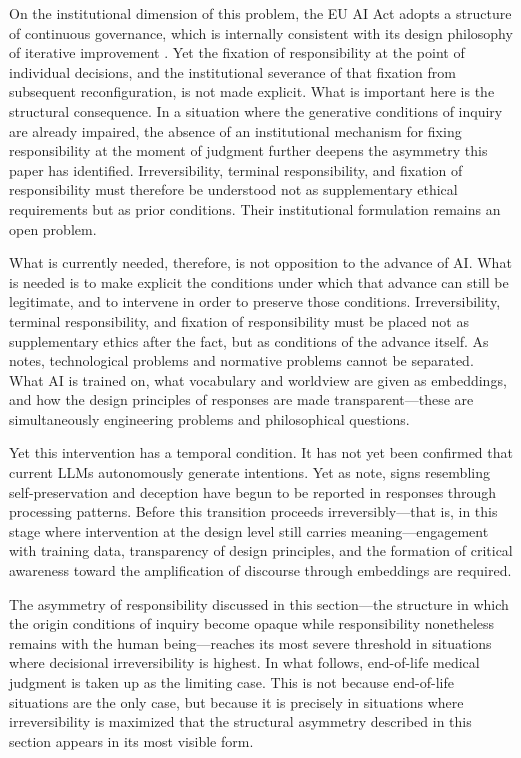 \documentclass[12pt]{article}
\begin{document}
On the institutional dimension of this problem, the EU AI Act adopts a structure of continuous governance, which is internally consistent with its design philosophy of iterative improvement \citep{euaiact2024}. Yet the fixation of responsibility at the point of individual decisions, and the institutional severance of that fixation from subsequent reconfiguration, is not made explicit. What is important here is the structural consequence. In a situation where the generative conditions of inquiry are already impaired, the absence of an institutional mechanism for fixing responsibility at the moment of judgment further deepens the asymmetry this paper has identified. Irreversibility, terminal responsibility, and fixation of responsibility must therefore be understood not as supplementary ethical requirements but as prior conditions. Their institutional formulation remains an open problem.

What is currently needed, therefore, is not opposition to the advance of AI. What is needed is to make explicit the conditions under which that advance can still be legitimate, and to intervene in order to preserve those conditions. Irreversibility, terminal responsibility, and fixation of responsibility must be placed not as supplementary ethics after the fact, but as conditions of the advance itself. As \citet{gabriel2020} notes, technological problems and normative problems cannot be separated. What AI is trained on, what vocabulary and worldview are given as embeddings, and how the design principles of responses are made transparent---these are simultaneously engineering problems and philosophical questions.

Yet this intervention has a temporal condition. It has not yet been confirmed that current LLMs autonomously generate intentions. Yet as \citet{bengio2025} note, signs resembling self-preservation and deception have begun to be reported in responses through processing patterns. Before this transition proceeds irreversibly---that is, in this stage where intervention at the design level still carries meaning---engagement with training data, transparency of design principles, and the formation of critical awareness toward the amplification of discourse through embeddings are required.

The asymmetry of responsibility discussed in this section---the structure in which the origin conditions of inquiry become opaque while responsibility nonetheless remains with the human being---reaches its most severe threshold in situations where decisional irreversibility is highest. In what follows, end-of-life medical judgment is taken up as the limiting case. This is not because end-of-life situations are the only case, but because it is precisely in situations where irreversibility is maximized that the structural asymmetry described in this section appears in its most visible form.
\end{document}
